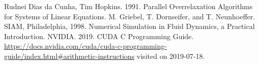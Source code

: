\documentclass{article}%
\begin{document}
\begin{thebibliography}{999}

Rudnei Dias da Cunha, Tim Hopkins. 1991. Parallel Overrelaxation Algorithms for Systems of Linear Equations.
M. Griebel, T. Dornseifer, and T. Neunhoeffer. SIAM, Philadelphia, 1998. Numerical Simulation in Fluid Dynamics, a Practical Introduction.
NVIDIA. 2019. CUDA C Programming Guide. \url{https://docs.nvidia.com/cuda/cuda-c-programming-guide/index.html#arithmetic-instructions} visited on 2019-07-18.
\end{thebibliography}
\end{document}
